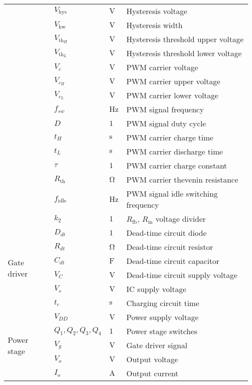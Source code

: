 \begin{longtable}{@{}llll@{}}
	& $V_{\mathrm{hys}}$ & $\si{\volt}$ & Hysteresis voltage \\
	& $V_{\mathrm{hw}}$ & $\si{\volt}$ & Hysteresis width \\
	& $V_{\mathrm{th}_{H}}$ & $\si{\volt}$ & Hysteresis threshold upper voltage \\
	& $V_{\mathrm{th}_{L}}$ & $\si{\volt}$ & Hysteresis threshold lower voltage \\
	& $V_{c}$ & $\si{\volt}$ & PWM carrier voltage \\
	& $V_{c_{H}}$ & $\si{\volt}$ & PWM carrier upper voltage \\
	& $V_{c_{L}}$ & $\si{\volt}$ & PWM carrier lower voltage \\
	& $f_{sw}$ & $\si{\hertz}$ & PWM signal frequency \\
	& $D$ & $1$ & PWM signal duty cycle \\
	& $t_{H}$ & $\si{\second}$ & PWM carrier charge time \\
	& $t_{L}$ & $\si{\second}$ & PWM carrier discharge time \\
	& $\tau$ & $1$ & PWM carrier charge constant \\
	& $R_{\mathrm{th}}$ & $\si{\ohm}$ & PWM carrier thevenin resistance \\
	& $f_{\mathrm{idle}}$ & $\si{\hertz}$ & PWM signal idle switching frequency \\
	& $k_{2}$ & $1$ & $R_{\mathrm{fb}}$, $R_{\mathrm{in}}$ voltage divider \\ \midrule
	\multirow{6}{*}{Gate driver}  & $D_{dt}$ & $1$ & Dead-time circuit diode \\
	& $R_{dt}$ & $\si{\ohm}$ & Dead-time circuit resistor \\
	& $C_{dt}$ & $\si{\farad}$ & Dead-time circuit capacitor \\
	& $V_{C}$ & $\si{\volt}$ & Dead-time circuit supply voltage \\
	& $V_{s}$ & $\si{\volt}$ & IC supply voltage \\
	& $t_{c}$ & $\si{\second}$ & Charging circuit time \\ \midrule
	\multirow{5}{*}{Power stage}  & $V_{DD}$ & $\si{\volt}$ & Power supply voltage \\
	& $Q_{1}, Q_{2}, Q_{3}, Q_{4}$ & $1$ & Power stage switches \\
	& $V_{g}$ & $\si{\volt}$ & Gate driver signal \\
	& $V_{o}$ & $\si{\volt}$ & Output voltage \\
	& $I_{o}$ & $\si{\ampere}$ & Output current \\

\end{longtable}
